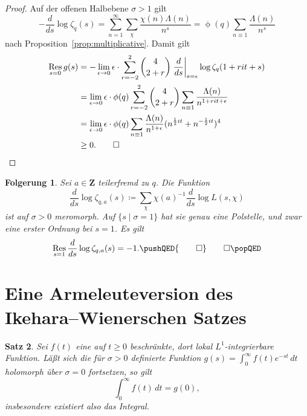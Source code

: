 \documentclass[a4paper,twoside,openright]{report}
\newtheorem{thm}{Satz}[chapter]
\newtheorem{cor}[thm]{Folgerung}
\theoremstyle{definition}
\theoremstyle{remark}
\DeclareMathOperator{\Res}{Res}
\DeclareMathOperator{\totient}{\phi}
\begin{document}
\begin{proof}
  Auf der offenen Halbebene $\sigma > 1$ gilt
  \[
    - \frac{d}{ds} \log \zeta_q(s) = \sum_{n = 1}^\infty \sum_\chi \frac{\chi(n) \Lambda(n)}{n^s}
    = \totient(q) \sum_{n \equiv 1} \frac{\Lambda(n)}{n^s}
  \]
  nach Proposition~\ref{prop:multiplicative}. Damit gilt
  \[
  	\begin{split}
		  \Res_{s = 0} g(s) & = - \lim_{\epsilon \to 0} \epsilon \cdot \sum_{r = -2}^2 \binom{4}{2 + r} \left.\frac d {ds}\right|_{s = \epsilon}
		 	\log \zeta_q(1 + r i t + s) 
  		\\
  		& = \lim_{\epsilon \to 0} \epsilon \cdot \totient(q) \sum_{r = -2}^2 \binom{4} {2 + r} \sum_{n \equiv 1} \frac{\Lambda(n)} {n^{1 + r i t + \epsilon}}
  		\\
  		& = \lim_{\epsilon \to 0} \epsilon \cdot \totient(q) \sum_{n \equiv 1} \frac{\Lambda(n)}{n^{1 + \epsilon}} (n^{\frac 1 2 i t} + n^{- \frac 1 2 i t})^4
  		\\
  		& \ge 0.
  		\qedhere
  	\end{split}
  \]  
\end{proof}

\begin{cor}
	\label{cor:residue}
	Sei $a \in \mathbf Z$ teilerfremd zu $q$. Die Funktion
	\[
		\frac d {ds} \log \zeta_{q, a}(s) \coloneqq
		\sum_\chi \chi(a)^{-1} \frac d {ds} \log L(s, \chi)
	\]
	ist auf $\sigma > 0$ meromorph. Auf $\{s \mid \sigma = 1\}$ hat sie
	genau eine Polstelle, und zwar eine erster Ordnung bei $s = 1$. Es gilt
	\[
		\Res_{s = 1} \frac d{ds} \log\zeta_{q, a}(s) = -1.
		\pushQED{\qed}
		\qedhere
		\popQED
	\]
\end{cor}

\section{Eine Armeleuteversion des Ikehara--Wiener\-schen Satzes}

\begin{thm}
  \label{thm:analytic}
  Sei $f(t)$ eine auf $t \ge 0$ beschränkte, dort lokal $L^1$-integrierbare
  Funk\-tion. Läßt sich die für $\sigma > 0$ definierte Funktion $g(s) = \int_0^\infty f(t) e^{-st} \, dt$
  holomorph über $\sigma = 0$ fortsetzen, so gilt
  \[
    \int_0^\infty f(t) \, dt = g(0),
  \]
  insbesondere existiert also das Integral.
\end{thm}
\end{document}
